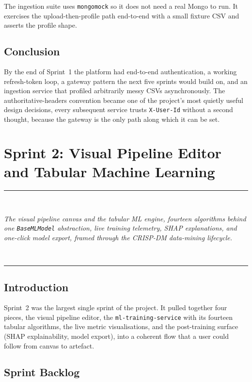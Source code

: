 \documentclass[12pt, a4paper, oneside]{report}
\newcommand{\chapterabstract}[1]{%
  \vspace*{1.2cm}%
  \begin{center}%
  \rule{0.45\textwidth}{0.4pt}\\[0.8em]%
  \begin{minipage}{0.82\textwidth}\centering\itshape\large #1\end{minipage}\\[0.8em]%
  \rule{0.45\textwidth}{0.4pt}%
  \end{center}%
  \vspace*{\fill}\clearpage}
\begin{document}
The ingestion suite uses \texttt{mongomock} so it does not need a
real Mongo to run. It exercises the upload-then-profile path
end-to-end with a small fixture CSV and asserts the profile shape.

\section*{Conclusion}

By the end of Sprint~1 the platform had end-to-end authentication, a
working refresh-token loop, a gateway pattern the next five sprints
would build on, and an ingestion service that profiled arbitrarily
messy CSVs asynchronously. The authoritative-headers convention
became one of the project's most quietly useful design decisions, every subsequent service trusts \texttt{X-User-Id} without a second
thought, because the gateway is the only path along which it can be
set.

\chapter{Sprint 2: Visual Pipeline Editor and Tabular Machine Learning}
\chapterabstract{The visual pipeline canvas and the tabular ML engine, fourteen
algorithms behind one \texttt{BaseMLModel} abstraction, live training telemetry,
SHAP explanations, and one-click model export, framed through the CRISP-DM
data-mining lifecycle.}

\section*{Introduction}

Sprint~2 was the largest single sprint of the project. It pulled
together four pieces, the visual pipeline editor, the
\texttt{ml-training-service} with its fourteen tabular algorithms,
the live metric visualisations, and the post-training surface (SHAP
explainability, model export), into a coherent flow that a user
could follow from canvas to artefact.

\section{Sprint Backlog}
\end{document}
